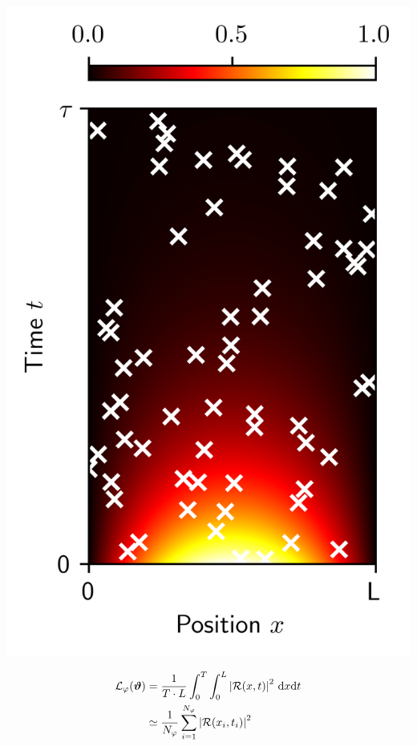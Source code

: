 \documentclass[aspectratio=169,compress,12pt,dvipsnames]{beamer}
\begin{document}
\begin{frame}
  \vfill
  \begin{minipage}{.28\textwidth}
    \centering
    \includegraphics[width=\textwidth]{spatio_temporal_sampling.png}
  \end{minipage}%
  \hfill
  \begin{minipage}{.68\textwidth}
    \[
      \begin{aligned}
        \mathcal{L}_{\varphi}(\boldsymbol{\vartheta}) & = \dfrac{1}{T \cdot L} \int_{0}^{T} \int_{0}^{L} \abs{\mathcal{R}(x, t)}^2 \ \dd x \dd t  \\
          & \simeq \dfrac{1}{N_{\varphi}} \sum_{i=1}^{N_{\varphi}} \abs{ \mathcal{R}(x_i, t_i) }^2
      \end{aligned}
    \]
  \end{minipage}
  \vfill
\end{frame}
\end{document}
